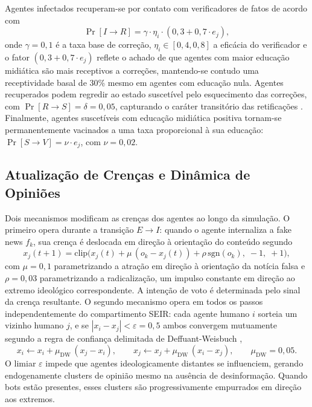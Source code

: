 \documentclass[12pt,a4paper]{article}
\theoremstyle{definition}
\theoremstyle{plain}
\begin{document}
Agentes infectados recuperam-se por contato com verificadores de fatos de acordo com
\begin{equation}
\Pr[I \to R] = \gamma \cdot \eta_i \cdot (0{,}3 + 0{,}7 \cdot e_j),
\label{eq:IR}
\end{equation}
onde $\gamma = 0{,}1$ é a taxa base de correção, $\eta_i \in [0{,}4, 0{,}8]$ a eficácia do verificador e o fator $(0{,}3 + 0{,}7 \cdot e_j)$ reflete o achado de que agentes com maior educação midiática são mais receptivos a correções, mantendo-se contudo uma receptividade basal de 30\% mesmo em agentes com educação nula. Agentes recuperados podem regredir ao estado suscetível pelo esquecimento das correções, com $\Pr[R \to S] = \delta = 0{,}05$, capturando o caráter transitório das retificações \citep{lewandowsky2012misinformation}. Finalmente, agentes suscetíveis com educação midiática positiva tornam-se permanentemente vacinados a uma taxa proporcional à sua educação: $\Pr[S \to V] = \nu \cdot e_j$, com $\nu = 0{,}02$.

\subsection{Atualização de Crenças e Dinâmica de Opiniões}
\label{subsec:belief}

Dois mecanismos modificam as crenças dos agentes ao longo da simulação. O primeiro opera durante a transição $E \to I$: quando o agente internaliza a fake news $f_k$, sua crença é deslocada em direção à orientação do conteúdo segundo
\begin{equation}
x_j(t+1) = \text{clip}\bigl(x_j(t) + \mu\,(o_k - x_j(t)) + \rho\,\text{sgn}(o_k),\;-1,\;+1\bigr),
\label{eq:belief}
\end{equation}
com $\mu = 0{,}1$ parametrizando a atração em direção à orientação da notícia falsa e $\rho = 0{,}03$ parametrizando a radicalização, um impulso constante em direção ao extremo ideológico correspondente. A intenção de voto é determinada pelo sinal da crença resultante. O segundo mecanismo opera em todos os passos independentemente do compartimento SEIR: cada agente humano $i$ sorteia um vizinho humano $j$, e se $|x_i - x_j| < \varepsilon = 0{,}5$ ambos convergem mutuamente segundo a regra de confiança delimitada de Deffuant-Weisbuch \citep{deffuant2000mixing},
\begin{equation}
x_i \leftarrow x_i + \mu_{\text{DW}}\,(x_j - x_i), \qquad x_j \leftarrow x_j + \mu_{\text{DW}}\,(x_i - x_j), \qquad \mu_{\text{DW}} = 0{,}05.
\end{equation}
O limiar $\varepsilon$ impede que agentes ideologicamente distantes se influenciem, gerando endogenamente clusters de opinião mesmo na ausência de desinformação. Quando bots estão presentes, esses clusters são progressivamente empurrados em direção aos extremos.
\end{document}
